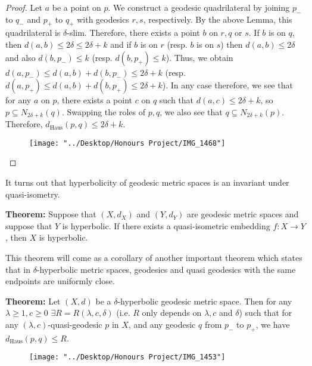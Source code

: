 \documentclass[12pt]{article}
\newcommand{\vs}{\vskip10pt}
\begin{document}
	\begin{proof}
		
		Let $a$ be a point on $p$. We construct a geodesic quadrilateral by joining $p_-$ to $q_-$ and $p_+$ to $q_+$ with geodesics $r,s$, respectively. By the above Lemma, this quadrilateral is $\delta$-slim. Therefore, there exists a point $b$ on $r,q$ or $s$. If $b$ is on $q$, then $d(a,b) \leq 2\delta \leq 2 \delta + k$ and if $b$ is on $r$ (resp. $b$ is on $s$) then $d(a,b) \leq 2\delta$ and also $d(b, p_-) \leq k$ (resp. $d(b, p_+) \leq k$). Thus, we obtain $d(a, p_-) \leq d(a,b) + d(b, p_-) \leq 2\delta + k$ (resp. $d(a, p_+) \leq d(a,b) + d(b, p_+) \leq 2\delta + k$). In any case therefore, we see that for any $a$ on $p$, there exists a point $c$ on $q$ such that $d(a,c) \leq 2 \delta + k$, so $p \subseteq N_{2 \delta + k} (q)$. Swapping the roles of $p,q$, we also see that $q \subseteq N_{2 \delta + k} (p)$. Therefore, $d_{\text{Haus}}(p,q) \leq 2 \delta + k$.
		
		\begin{figure} [h]
			\centering
			\texttt{[image: "../Desktop/Honours Project/IMG\_1468"]}
			\caption{}
			\label{fig:img1468}
		\end{figure}
		
	\end{proof}
	
	It turns out that hyperbolicity of geodesic metric spaces is an invariant under quasi-isometry. 
	
	\vs 
	
	\textbf{Theorem: } Suppose that $(X,d_X)$ and $(Y, d_Y)$ are geodesic metric spaces and  suppose that $Y$ is hyperbolic. If there exists a quasi-isometric embedding $f : X \rightarrow Y$, then $X$ is hyperbolic. 
	
	\vs 
	
	This theorem will come as a corollary of another important theorem which states that in $\delta$-hyperbolic metric spaces, geodesics and quasi geodesics with the same endpoints are uniformly close. 
	
	\vs 
	
	\textbf{Theorem: } Let $(X,d)$ be a $\delta$-hyperbolic geodesic metric space. Then for any $\lambda \geq 1, c \geq 0$ $\exists R = R(\lambda, c, \delta)$ (i.e. $R$ only depends on $\lambda, c$ and $\delta$) such that for any $(\lambda, c)$-quasi-geodesic $p$ in $X$, and any geodesic $q$ from $p_-$ to $p_+$, we have $d_{\text{Haus}}(p,q) \leq R$. 
	
\begin{figure} [h]
	\centering
	\texttt{[image: "../Desktop/Honours Project/IMG\_1453"]}
	\caption{}
	\label{fig:img1453}
\end{figure}
	
\end{document}
